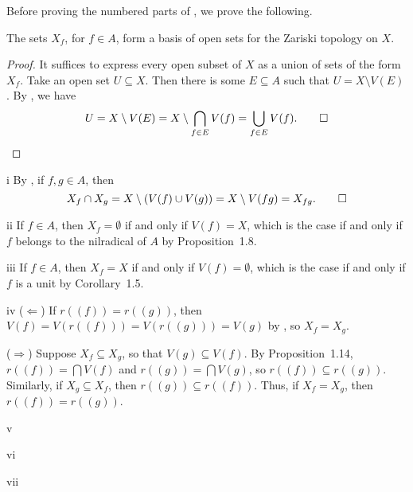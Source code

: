 Before proving the numbered parts of , we prove the following.

\begin{claim}
The sets \(X_f\), for \(f \in A\), form a basis of open sets for the Zariski topology on \(X\).
\end{claim}

\begin{proof}
It suffices to express every open subset of \(X\) as a union of sets of the form \(X_f\).
Take an open set \(U \subseteq X\).
Then there is some \(E \subseteq A\) such that \(U = X \setminus V(E)\).
By , we have
\begin{equation*}
U
= X \setminus V(E)
= X \setminus \bigcap_{f \in E} V(f)
= \bigcup_{f \in E} V(f).
\qedhere
\end{equation*}
\end{proof}

\begin{partsolution}{i}
By , if \(f, g \in A\), then
\begin{equation*}
X_f \cap X_g = X \setminus (V(f) \cup V(g)) = X \setminus V(f g) = X_{f g}.
\qedhere
\end{equation*}
\end{partsolution}

\begin{partsolution}{ii}
If \(f \in A\), then \(X_f = \emptyset\) if and only if \(V(f) = X\), which is the case if and only if \(f\) belongs to the nilradical of \(A\) by Proposition~1.8.
\end{partsolution}

\begin{partsolution}{iii}
If \(f \in A\), then \(X_f = X\) if and only if \(V(f) = \emptyset\), which is the case if and only if \(f\) is a unit by Corollary~1.5.
\end{partsolution}

\begin{partsolution}{iv}
(\(\Leftarrow\))
If \(r((f)) = r((g))\), then \(V(f) = V(r((f))) = V(r((g))) = V(g)\) by , so \(X_f = X_g\).

(\(\Rightarrow\))
Suppose \(X_f \subseteq X_g\), so that \(V(g) \subseteq V(f)\).
By Proposition~1.14, \(r((f)) = \bigcap V(f)\) and \(r((g)) = \bigcap V(g)\), so \(r((f)) \subseteq r((g))\).
Similarly, if \(X_g \subseteq X_f\), then \(r((g)) \subseteq r((f))\).
Thus, if \(X_f = X_g\), then \(r((f)) = r((g))\).
\end{partsolution}

\begin{partsolution}{v}

\end{partsolution}

\begin{partsolution}{vi}

\end{partsolution}

\begin{partsolution}{vii}

\end{partsolution}